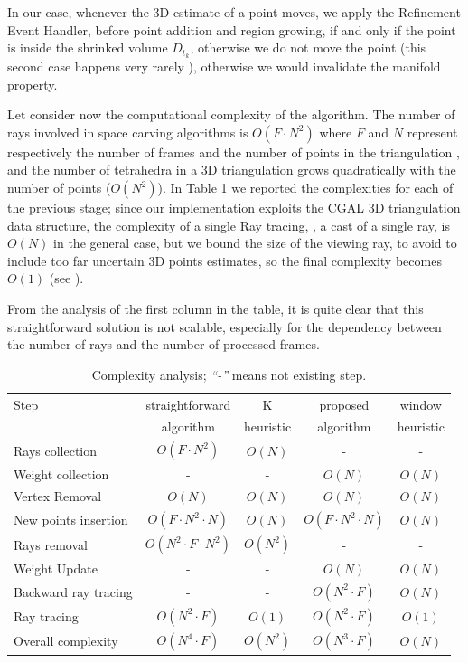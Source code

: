 In our case, whenever the 3D estimate of a point moves, we apply the Refinement Event Handler, before point addition and region growing, if and only if the point is inside the shrinked volume $D_{t_k}$, otherwise we do not move the point (this second case happens very rarely \cite{litvinov_lhuillier_13}), otherwise we would invalidate the manifold property.

Let consider now the computational complexity of the algorithm.
The number of rays involved in space carving algorithms is $O(F\cdot N^2)$ where $F$ and $N$ represent respectively the number of frames and the number of points in the triangulation \cite{lovi_et_al_11}, and the number of tetrahedra in a 3D triangulation grows quadratically with the number of points ($O(N^2)$). 
In Table \ref{tab:ComStraight} we reported the complexities for each of the previous stage; since our implementation exploits the CGAL \cite{cgal} 3D triangulation data structure, the complexity of a single Ray tracing, \ie, a cast of a single ray, is $O(N)$ in the general case, but we bound the size of the viewing ray, to avoid to include too far uncertain 3D points estimates, so the final complexity becomes $O(1)$  (see \cite[p.94]{yu2013automatic}).

From the analysis of the first column in the table, it is quite clear that this straightforward solution is not scalable, especially for the dependency between the number of rays and the number of processed frames. 

\begin{table}[t]
\small
\setlength{\tabcolsep}{1px}
\caption{Complexity analysis; \emph{``-''} means not existing step.}
\label{tab:ComStraight}
\centering
\begin{tabular}{lcccc}
\toprule 
Step                & straightforward     & K  & proposed     & window \\
                    & algorithm & heuristic & algorithm & heuristic \\
\midrule
Rays collection     &  $O(F\cdot N^2)$ & $O(N)$ &-&-\\
Weight collection    &-&- &  $O(N)$ & $O(N)$ \\
Vertex Removal      &  $O(N)$           & $O(N)$ &  $O(N)$           & $O(N)$ \\
New points insertion&  $O(F\cdot N^2 \cdot N)$ & $O(N)$ &  $O(F\cdot N^2 \cdot N)$ & $O(N)$ \\
Rays removal     &  $O(N^2\cdot F\cdot N^2)$ & $O(N^2)$ &-&-\\
Weight Update     &-&-&  $O(N)$ & $O(N)$ \\
Backward ray tracing &-&-    &  $O(N^2\cdot F)$ & $O(N)$ \\
Ray tracing     &  $O(N^2\cdot F)$ & $O(1)$ &  $O(N^2\cdot F)$ & $O(1)$ \\
\midrule
Overall complexity     &  $O(N^4\cdot F)$ & $O(N^2)$ &  $O(N^3\cdot F)$ & $O(N)$ \\
\end{tabular}
\end{table}


